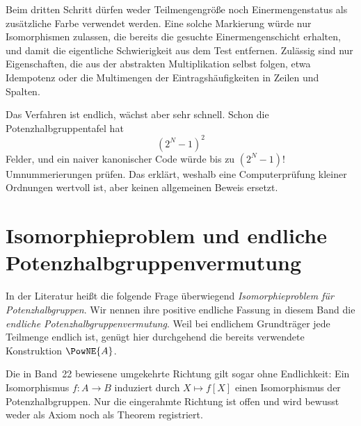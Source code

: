 \documentclass[main.tex]{subfiles}
\begin{document}
\begin{remark}
Beim dritten Schritt dürfen weder Teilmengengröße noch Einermengenstatus als
zusätzliche Farbe verwendet werden.  Eine solche Markierung würde nur
Isomorphismen zulassen, die bereits die gesuchte Einermengenschicht erhalten,
und damit die eigentliche Schwierigkeit aus dem Test entfernen.  Zulässig
sind nur Eigenschaften, die aus der abstrakten Multiplikation selbst folgen,
etwa Idempotenz oder die Multimengen der Eintragshäufigkeiten in Zeilen und
Spalten.
\end{remark}

Das Verfahren ist endlich, wächst aber sehr schnell.  Schon die
Potenzhalbgruppentafel hat
\[
  (2^N-1)^2
\]
Felder, und ein naiver kanonischer Code würde bis zu
\((2^N-1)!\) Umnummerierungen prüfen.  Das erklärt, weshalb eine
Computerprüfung kleiner Ordnungen wertvoll ist, aber keinen allgemeinen
Beweis ersetzt.

\section{Isomorphieproblem und endliche Potenzhalbgruppenvermutung}

In der Literatur heißt die folgende Frage überwiegend
\emph{Isomorphieproblem für Potenzhalbgruppen}.  Wir nennen ihre positive
endliche Fassung in diesem Band die \emph{endliche
Potenzhalbgruppenvermutung}.  Weil bei endlichem Grundträger jede Teilmenge
endlich ist, genügt hier durchgehend die bereits verwendete Konstruktion
\(\PowNE{A}\).

\begin{samepage}
\begin{center}
\end{center}
\end{samepage}

Die in Band~22 bewiesene umgekehrte Richtung gilt sogar ohne Endlichkeit:
Ein Isomorphismus \(f\colon A\to B\) induziert durch \(X\mapsto f[X]\) einen
Isomorphismus der Potenzhalbgruppen.  Nur die eingerahmte Richtung ist offen
und wird bewusst weder als Axiom noch als Theorem registriert.
\end{document}
